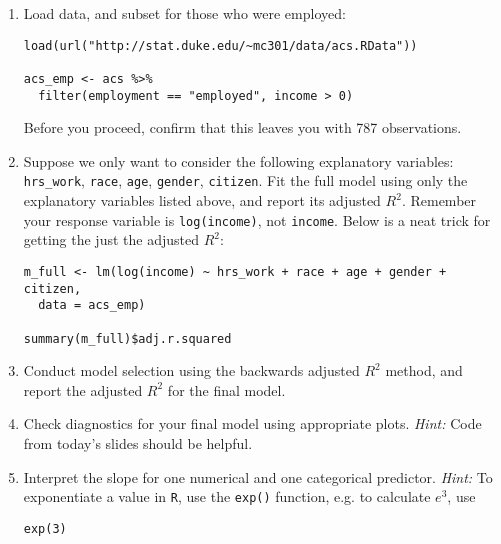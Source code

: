 \documentclass[12pt]{article}
\begin{document}
\begin{enumerate}

\item  Load data, and subset for those who were employed:

\begin{Verbatim}[frame=single, formatcom=\color{blue}]
load(url("http://stat.duke.edu/~mc301/data/acs.RData"))

acs_emp <- acs %>%
  filter(employment == "employed", income > 0)
\end{Verbatim}

Before you proceed, confirm that this leaves you with 787 observations.

\item Suppose we only want to consider the following explanatory variables: \texttt{hrs\_work}, \texttt{race}, 
\texttt{age}, \texttt{gender}, \texttt{citizen}. Fit the full model using only the explanatory variables listed above, 
and report its adjusted $R^2$. Remember your response variable is \texttt{log(income)}, not \texttt{income}. 
Below is a neat trick for getting the just the adjusted $R^2$:

\begin{Verbatim}[frame=single, formatcom=\color{blue}]
m_full <- lm(log(income) ~ hrs_work + race + age + gender + citizen, 
  data = acs_emp)

summary(m_full)$adj.r.squared
\end{Verbatim}

\item Conduct model selection using the backwards adjusted $R^2$ method, and report the adjusted 
$R^2$ for the final model.

\item Check diagnostics for your final model using appropriate plots. \textit{Hint:} Code from today's 
slides should be helpful.

\item Interpret the slope for one numerical and one categorical predictor. \textit{Hint:} To exponentiate a 
value in \texttt{R}, use the \texttt{exp()} function, e.g. to calculate $e^3$, use

\begin{Verbatim}[frame=single, formatcom=\color{blue}]
exp(3)
\end{Verbatim}

\end{enumerate}

%
\end{document}
